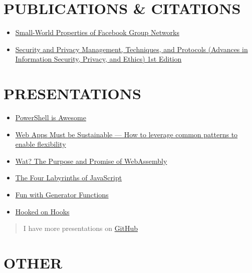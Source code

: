 \documentclass[10pt]{article}
\def\tightlist{}
\begin{document}
\hypertarget{publications-citations}{%
\section{PUBLICATIONS \& CITATIONS}\label{publications-citations}}

\begin{itemize}
\tightlist
\item
  \href{http://wpmedia.wolfram.com/uploads/sites/13/2018/02/23-3-1.pdf}{Small-World
  Properties of Facebook Group Networks}
\item
  \href{https://smile.amazon.com/gp/product/1522555838/ref=ppx_yo_dt_b_asin_title_o02_s00?ie=UTF8\&psc=1}{Security
  and Privacy Management, Techniques, and Protocols (Advances in
  Information Security, Privacy, and Ethics) 1st Edition}
\end{itemize}

\hypertarget{presentations}{%
\section{PRESENTATIONS}\label{presentations}}

\begin{itemize}
\tightlist
\item
  \href{https://powershell.surge.sh/}{PowerShell is Awesome}
\item
  \href{http://sustainable.surge.sh/}{Web Apps Must be Sustainable ---
  How to leverage common patterns to enable flexibility}
\item
  \href{http://wat-brown-bag.surge.sh/}{Wat? The Purpose and Promise of
  WebAssembly}
\item
  \href{http://www.jasonwohlgemuth.com/slides-javascript-labyrinths/\#/title}{The
  Four Labyrinths of JavaScript}
\item
  \href{https://generators.surge.sh/}{Fun with Generator Functions}
\item
  \href{http://hooked-on-hooks.surge.sh/}{Hooked on Hooks}
\end{itemize}

\begin{quote}
I have more presentations on \href{https://github.com/?q=slides}{GitHub}
\end{quote}

\hypertarget{other}{%
\section{OTHER}\label{other}}
\end{document}
